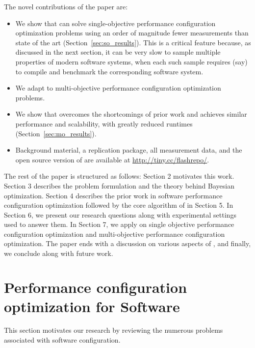 \noindent The novel contributions of the paper are:
\begin{itemize}[leftmargin=*]
    \item  We show that \flash can  solve single-objective performance configuration optimization problems using
    an order of magnitude fewer measurements than
    state of the art (Section~\ref{sec:so_results}). This is a critical feature 
    because, as discussed in the next section, it can be very slow
    to sample multiple properties of modern software systems, when each
    such sample requires (say) to compile and benchmark the corresponding software system.
    \item We adapt \flash to multi-objective performance configuration optimization problems.
    \item We show that \flash   overcomes the shortcomings of prior work and achieves similar performance and scalability, with greatly reduced runtimes (Section~\ref{sec:mo_results}).
    \item Background material, a replication package, all measurement data, and
the open source version of \flash
are available at \url{http://tiny.cc/flashrepo/}.
\end{itemize}
The rest of the paper is structured as follows: Section 2 motivates this work. Section 3 describes the problem formulation and the theory behind Bayesian optimization. Section 4 describes the prior work in software performance configuration optimization followed by the core algorithm of \flash in Section 5. In Section 6, we present our research questions along with experimental settings used to answer them. In Section 7, we apply \flash on single objective performance configuration optimization and multi-objective performance configuration optimization. 
The paper ends with a discussion on various aspects of \flash, and finally, we conclude along with future work.








\section{Performance configuration optimization for Software} \label{sec:perf_opt}

 This section  motivates our research by 
 reviewing the numerous problems associated with 
  software configuration.

